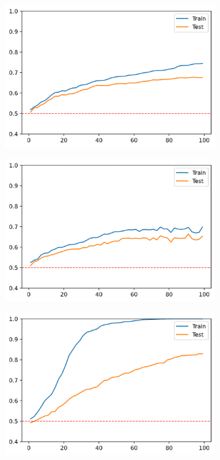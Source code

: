 \begin{figure}[h]
    \centering
    \begin{subfigure}[b]{0.32\linewidth}
        \includegraphics[width=\linewidth]{img/ch5/kernel/random_liblinarl.png}
    \end{subfigure}
    \begin{subfigure}[b]{0.32\linewidth}
        \includegraphics[width=\linewidth]{img/ch5/kernel/random_linar.png}
    \end{subfigure}
    \begin{subfigure}[b]{0.32\linewidth}
        \includegraphics[width=\linewidth]{img/ch5/kernel/random_precomputed.png}

\end{subfigure}
\end{figure}
